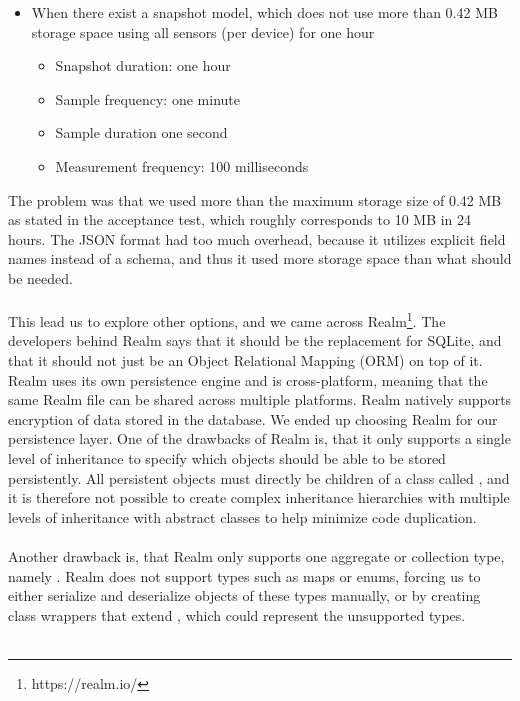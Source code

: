 \begin{itemize}[noitemsep]
   \item When there exist a snapshot model, which does not use more than 0.42 MB storage space using all sensors (per device) for one hour
   \begin{itemize}[noitemsep,topsep=0pt,parsep=0pt,partopsep=0pt]
      \item Snapshot duration: one hour
      \item Sample frequency: one minute
      \item Sample duration one second
      \item Measurement frequency: 100 milliseconds
   \end{itemize}
\end{itemize}

The problem was that we used more than the maximum storage size of 0.42 MB as stated in the acceptance test, which roughly corresponds to 10 MB in 24 hours. The JSON format had too much overhead, because it utilizes explicit field names instead of a schema, and thus it used more storage space than what should be needed. 
\\\\
This lead us to explore other options, and we came across Realm\footnote{https://realm.io/}. The developers behind Realm says that it should be the replacement for SQLite, and that it should not just be an Object Relational Mapping (ORM) on top of it. Realm uses its own persistence engine and is cross-platform, meaning that the same Realm file can be shared across multiple platforms. Realm natively supports encryption of data stored in the database. We ended up choosing Realm for our persistence layer. One of the drawbacks of Realm is, that it only supports a single level of inheritance to specify which objects should be able to be stored persistently. All persistent objects must directly be children of a class called , and it is therefore not possible to create complex inheritance hierarchies with multiple levels of inheritance with abstract classes to help minimize code duplication.  
\\\\
Another drawback is, that Realm only supports one aggregate or collection type, namely . Realm does not support types such as maps or enums, forcing us to either serialize and deserialize objects of these types manually, or by creating class wrappers that extend , which could represent the unsupported types.
\\\\
